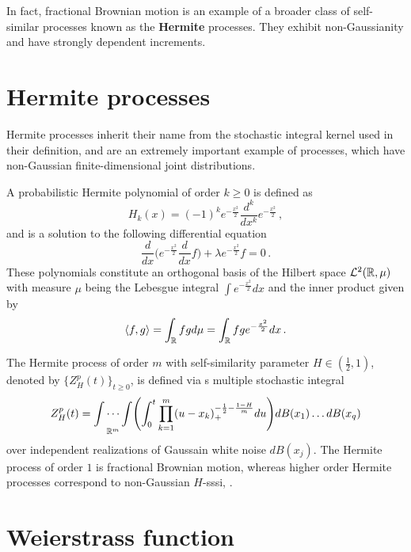 In fact, fractional Brownian motion is an example of a broader class of self-similar
processes known as the \textbf{Hermite} processes. They exhibit non-Gaussianity and have
strongly dependent increments.


\section{Hermite processes} %
\label{sec:hermite_processes}

Hermite processes inherit their name from the stochastic integral kernel used in
their definition, and are an extremely important example of processes, which have 
non-Gaussian finite-dimensional joint distributions.

A probabilistic Hermite polynomial of order $k\geq0$ is defined as 
\[ H_k(x) = (-1)^k e^{-\frac{x^2}{2}} \frac{d^k}{dx^k} e^{-\frac{x^2}{2}} \,,\]
and is a solution to the following differential equation
\[
 \frac{d}{dx}\biggl( e^{-\frac{x^2}{2}} \frac{d}{dx} f\biggr) + \lambda e^{-\frac{x^2}{2}} f = 0 \,.
\]
These polynomials constitute an orthogonal basis of the Hilbert space $\mathcal{L}^2(\mathbb{R}, \mu)$
with measure $\mu$ being the Lebesgue integral $\int e^{-\frac{x^2}{2}} dx$ and the inner
product given by
\[
\langle f, g\rangle = \int_{\mathbb{R}} f g d\mu = \int_{\mathbb{R}} f g e^{-\frac{x^2}{2}} dx \,.
\]

The Hermite process of order $m$ with self-similarity parameter $H\in(\tfrac{1}{2},1)$,
denoted by $\bigl\{Z_H^p(t)\bigr\}_{t\geq 0}$, is defined via s multiple stochastic
integral
\[
Z_H^p(t) = \underset{\mathbb{R}^m}{\int \cdots \int} \Biggl(
\int^t_0 \prod_{k=1}^m (u-x_k)_+^{-\frac{1}{2}-\frac{1-H}{m}} du\Biggr) dB(x_1) \ldots dB(x_q)
\]
over independent realizations of Gaussain white noise $dB(x_j)$. The Hermite process
of order $1$ is fractional Brownian motion, whereas higher order Hermite processes
correspond to non-Gaussian $H$-sssi, \cite{Bai20141710}.


\section{Weierstrass function} %
\label{sec:weierstrass_function}

